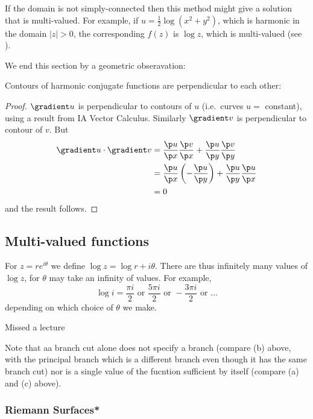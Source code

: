 \documentclass[a4paper]{article}
\begin{document}
If the domain is not simply-connected then this method might give a solution that is multi-valued. For example, if \(u = \frac{1}{2} \log(x^2 + y^2)\), which is harmonic in the domain \(|z| > 0\), the corresponding \(f(z)\) is \(\log z\), which is multi-valued (see ).

We end this section by a geometric obseravation:

\begin{proposition}
  Contours of harmonic conjugate functions are perpendicular to each other:
\end{proposition}

\begin{proof}
  \(\gradient u\) is perpendicular to contours of \(u\) (i.e.\ curves \(u = \) constant), using a result from IA Vector Calculus. Similarly \(\gradient v\) is perpendicular to contour of \(v\). But
  \begin{align*}
    \gradient u \cdot \gradient v &= \frac{\p u}{\p x}\frac{\p v}{\p x} + \frac{\p u}{\p y}\frac{\p v}{\p y} \\
                                  &= \frac{\p u}{\p x}\left(-\frac{\p u}{\p y}\right) + \frac{\p u}{\p y}\frac{\p u}{\p x} \\
                                  &= 0
  \end{align*}
  and the result follows.
\end{proof}

\subsection{Multi-valued functions}\label{sec:multi-valued functions}

For \(z = re^{i\theta}\) we define \(\log z = \log r + i\theta\). There are thus infinitely many values of \(\log z\), for \(\theta\) may take an infinity of values. For example,
\[
  \log i = \frac{\pi i}{2} \text{ or } \frac{5\pi i}{2} \text{ or } -\frac{3\pi i}{2} \text{ or } \dots
\]
depending on which choice of \(\theta\) we make.

Missed a lecture

Note that aa branch cut alone does not specify a branch (compare (b) above, with the principal branch which is a different branch even though it has the same branch cut) nor is a single value of the fucntion sufficient by itself (compare (a) and (c) above).

\subsubsection{Riemann Surfaces*}
\end{document}
